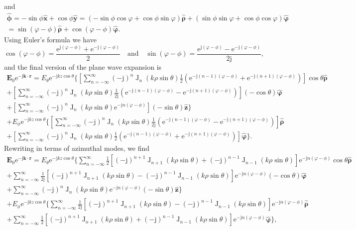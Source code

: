 \documentclass[a4paper,12pt]{article}
\renewcommand{\vec}[1]{\boldsymbol{#1}}
\newcommand{\unitvec}[1]{\hat{\vec{#1}}}
\newcommand{\mrm}[1]{\mathrm{#1}}
\newcommand{\ju}{\mrm{j}}
\newcommand{\eu}{\mrm{e}}
\newcommand{\Ev}{\vec{E}}
\newcommand{\rv}{\vec{r}}
\newcommand{\kv}{\vec{k}}
\newcommand{\xuv}{\unitvec{x}}
\newcommand{\yuv}{\unitvec{y}}
\newcommand{\zuv}{\unitvec{z}}
\newcommand{\rhouv}{\unitvec{\rho}}
\newcommand{\varphiuv}{\unitvec{\varphi}}
\newcommand{\phiuv}{\unitvec{\phi}}
\newcommand{\BesselJ}{\operatorname{J}}
\begin{document}
and
\begin{multline}
  \phiuv = -\sin\phi\xuv + \cos\phi\yuv = (-\sin\phi\cos\varphi + \cos\phi\sin\varphi)\rhouv + (\sin\phi\sin\varphi + \cos\phi\cos\varphi)\varphiuv \\
  = \sin(\varphi-\phi)\rhouv + \cos(\varphi-\phi)\varphiuv.
\end{multline}
Using Euler's formula we have
\begin{equation}
  \cos(\varphi-\phi) = \frac{\eu^{\ju(\varphi-\phi)}+\eu^{-\ju(\varphi-\phi)}}{2} \quad\text{and}\quad \sin(\varphi-\phi) = \frac{\eu^{\ju(\varphi-\phi)}-\eu^{-\ju(\varphi-\phi)}}{2\ju},
\end{equation}
and the final version of the plane wave expansion is
\begin{multline}
  \Ev_{0}\eu^{-\ju\kv\cdot\rv} = E_{\theta}\eu^{-\ju kz\cos\theta} \Bigg\{ \left[ \sum_{n=-\infty}^{\infty}(-\ju)^{n}\BesselJ_{n}(k\rho\sin\theta)\frac{1}{2}(\eu^{-\ju (n-1)(\varphi-\phi)} + \eu^{-\ju (n+1)(\varphi-\phi)}) \right]\cos\theta\rhouv \\
  + \left[ \sum_{n=-\infty}^{\infty}(-\ju)^{n}\BesselJ_{n}(k\rho\sin\theta) \frac{1}{2\ju}(\eu^{-\ju (n-1)(\varphi-\phi)} - \eu^{-\ju (n+1)(\varphi-\phi)}) \right](-\cos\theta)\varphiuv \\
  + \left[ \sum_{n=-\infty}^{\infty}(-\ju)^{n}\BesselJ_{n}(k\rho\sin\theta)\eu^{-\ju n(\varphi-\phi)}\right](-\sin\theta)\zuv \Bigg\} \\
  + E_{\phi}\eu^{-\ju kz\cos\theta} \Bigg\{ \left[ \sum_{n=-\infty}^{\infty}(-\ju)^{n}\BesselJ_{n}(k\rho\sin\theta) \frac{1}{2\ju}(\eu^{-\ju (n-1)(\varphi-\phi)} - \eu^{-\ju (n+1)(\varphi-\phi)}) \right]\rhouv \\
  + \left[ \sum_{n=-\infty}^{\infty}(-\ju)^{n}\BesselJ_{n}(k\rho\sin\theta)\frac{1}{2}(\eu^{-\ju (n-1)(\varphi-\phi)} + \eu^{-\ju (n+1)(\varphi-\phi)}) \right] \varphiuv \Bigg\}.
\end{multline}
Rewriting in terms of azimuthal modes, we find
\begin{multline}
  \Ev_{0}\eu^{-\ju\kv\cdot\rv} = E_{\theta}\eu^{-\ju kz\cos\theta} \Bigg\{ \sum_{n=-\infty}^{\infty} \frac{1}{2}\left[ (-\ju)^{n+1}\BesselJ_{n+1}(k\rho\sin\theta) + (-\ju)^{n-1}\BesselJ_{n-1}(k\rho\sin\theta)\right] \eu^{-\ju n(\varphi-\phi)} \cos\theta\rhouv \\
  + \sum_{n=-\infty}^{\infty} \frac{1}{2\ju}\left[ (-\ju)^{n+1}\BesselJ_{n+1}(k\rho\sin\theta) - (-\ju)^{n-1}\BesselJ_{n-1}(k\rho\sin\theta)\right] \eu^{-\ju n(\varphi-\phi)} (-\cos\theta)\varphiuv \\
  + \sum_{n=-\infty}^{\infty}(-\ju)^{n}\BesselJ_{n}(k\rho\sin\theta)\eu^{-\ju n(\varphi-\phi)} (-\sin\theta)\zuv \Bigg\} \\
  + E_{\phi}\eu^{-\ju kz\cos\theta} \Bigg\{ \sum_{n=-\infty}^{\infty} \frac{1}{2\ju} \left[ (-\ju)^{n+1}\BesselJ_{n+1}(k\rho\sin\theta) - (-\ju)^{n-1}\BesselJ_{n-1}(k\rho\sin\theta)\right] \eu^{-\ju n(\varphi-\phi)} \rhouv \\
  + \sum_{n=-\infty}^{\infty} \frac{1}{2} \left[ (-\ju)^{n+1}\BesselJ_{n+1}(k\rho\sin\theta) + (-\ju)^{n-1}\BesselJ_{n-1}(k\rho\sin\theta) \right] \eu^{-\ju n(\varphi-\phi)} \varphiuv \Bigg\},
  \label{eq:planewave}
\end{multline}
\end{document}
